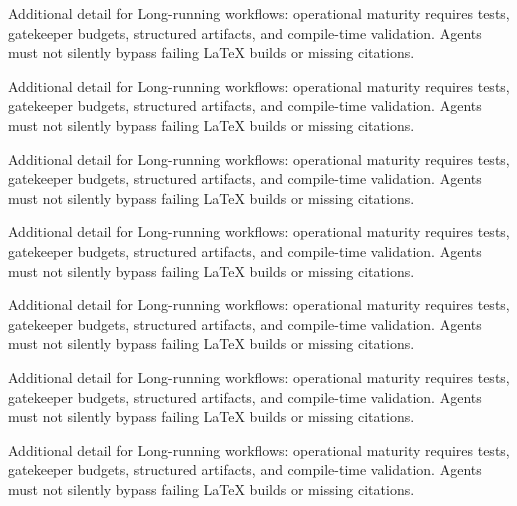 Additional detail for Long-running workflows: operational maturity requires tests, gatekeeper budgets, structured artifacts, and compile-time validation. Agents must not silently bypass failing LaTeX builds or missing citations. \cite{crewai2024} \cite{langgraph2024} \cite{mcp2024}

Additional detail for Long-running workflows: operational maturity requires tests, gatekeeper budgets, structured artifacts, and compile-time validation. Agents must not silently bypass failing LaTeX builds or missing citations. \cite{crewai2024} \cite{langgraph2024} \cite{mcp2024}

Additional detail for Long-running workflows: operational maturity requires tests, gatekeeper budgets, structured artifacts, and compile-time validation. Agents must not silently bypass failing LaTeX builds or missing citations. \cite{crewai2024} \cite{langgraph2024} \cite{mcp2024}

Additional detail for Long-running workflows: operational maturity requires tests, gatekeeper budgets, structured artifacts, and compile-time validation. Agents must not silently bypass failing LaTeX builds or missing citations. \cite{crewai2024} \cite{langgraph2024} \cite{mcp2024}

Additional detail for Long-running workflows: operational maturity requires tests, gatekeeper budgets, structured artifacts, and compile-time validation. Agents must not silently bypass failing LaTeX builds or missing citations. \cite{crewai2024} \cite{langgraph2024} \cite{mcp2024}

Additional detail for Long-running workflows: operational maturity requires tests, gatekeeper budgets, structured artifacts, and compile-time validation. Agents must not silently bypass failing LaTeX builds or missing citations. \cite{crewai2024} \cite{langgraph2024} \cite{mcp2024}

Additional detail for Long-running workflows: operational maturity requires tests, gatekeeper budgets, structured artifacts, and compile-time validation. Agents must not silently bypass failing LaTeX builds or missing citations. \cite{crewai2024} \cite{langgraph2024} \cite{mcp2024}
